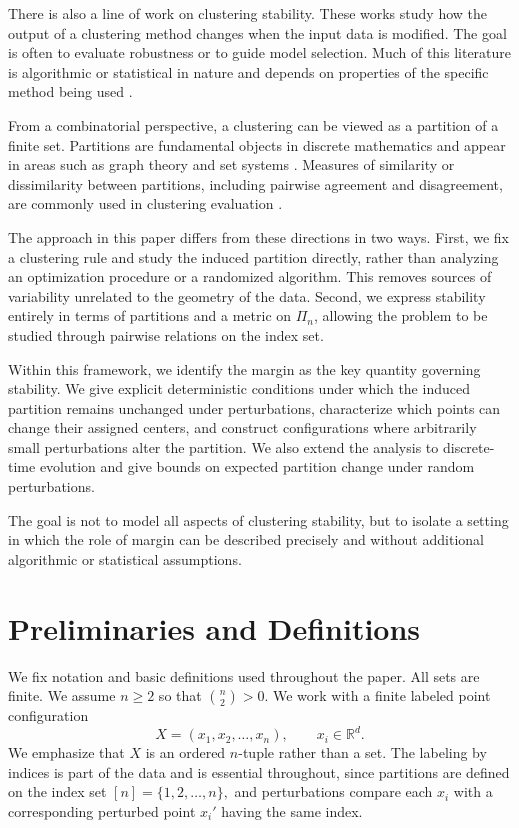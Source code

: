 \documentclass[11pt]{amsart}
\theoremstyle{plain}
\theoremstyle{definition}
\begin{document}
There is also a line of work on clustering stability. These works study how the output of a clustering method changes when the input data is modified. The goal is often to evaluate robustness or to guide model selection. Much of this literature is algorithmic or statistical in nature and depends on properties of the specific method being used \cite{3,4}.

From a combinatorial perspective, a clustering can be viewed as a partition of a finite set. Partitions are fundamental objects in discrete mathematics and appear in areas such as graph theory and set systems \cite{5}. Measures of similarity or dissimilarity between partitions, including pairwise agreement and disagreement, are commonly used in clustering evaluation \cite{6}.

The approach in this paper differs from these directions in two ways. First, we fix a clustering rule and study the induced partition directly, rather than analyzing an optimization procedure or a randomized algorithm. This removes sources of variability unrelated to the geometry of the data. Second, we express stability entirely in terms of partitions and a metric on $\Pi_n$, allowing the problem to be studied through pairwise relations on the index set.

Within this framework, we identify the margin as the key quantity governing stability. We give explicit deterministic conditions under which the induced partition remains unchanged under perturbations, characterize which points can change their assigned centers, and construct configurations where arbitrarily small perturbations alter the partition. We also extend the analysis to discrete-time evolution and give bounds on expected partition change under random perturbations.

The goal is not to model all aspects of clustering stability, but to isolate a setting in which the role of margin can be described precisely and without additional algorithmic or statistical assumptions.

\section{Preliminaries and Definitions}

We fix notation and basic definitions used throughout the paper. All sets are finite. We assume $n \ge 2$ so that $\binom{n}{2} > 0$.
We work with a finite labeled point configuration
\[
X = (x_1, x_2, \ldots, x_n), \qquad x_i \in \mathbb{R}^d.
\]
We emphasize that $X$ is an ordered $n$-tuple rather than a set. The labeling by indices is part of the data and is essential throughout, since partitions are defined on the index set
$[n] = \{1,2,\ldots,n\},$
and perturbations compare each $x_i$ with a corresponding perturbed point $x_i'$ having the same index.
\end{document}
